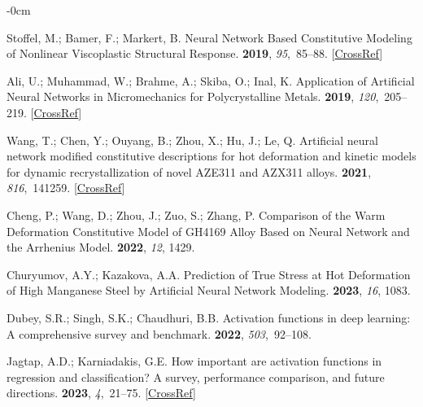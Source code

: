 \documentclass[algorithms,article,accept,pdftex,oneauthor]{Definitions/mdpi}
\begin{document}
\begin{adjustwidth}{-\extralength}{0cm}
\begin{thebibliography}{999}
Stoffel, M.; Bamer, F.; Markert, B.
\newblock Neural Network Based Constitutive Modeling of Nonlinear Viscoplastic
Structural Response.
 {\bf 2019}, {\em 95},~85--88. [\href{http://dx.doi.org/10.1016/j.mechrescom.2019.01.004}{CrossRef}]

Ali, U.; Muhammad, W.; Brahme, A.; Skiba, O.; Inal, K.
\newblock Application of Artificial Neural Networks in Micromechanics for
Polycrystalline Metals.
 {\bf 2019}, {\em
120},~205--219. [\href{http://dx.doi.org/10.1016/j.ijplas.2019.05.001}{CrossRef}]

Wang, T.; Chen, Y.; Ouyang, B.; Zhou, X.; Hu, J.; Le, Q.
\newblock Artificial neural network modified constitutive descriptions for hot
deformation and kinetic models for dynamic recrystallization of novel AZE311
and AZX311 alloys.
 {\bf 2021}, {\em
816},~141259. [\href{http://dx.doi.org/10.1016/j.msea.2021.141259}{CrossRef}]

Cheng, P.; Wang, D.; Zhou, J.; Zuo, S.; Zhang, P.
\newblock Comparison of the Warm Deformation Constitutive Model of GH4169 Alloy
Based on Neural Network and the Arrhenius Model.
 {\bf 2022}, {\em 12}, 1429.

Churyumov, A.Y.; Kazakova, A.A.
\newblock Prediction of True Stress at Hot Deformation of High Manganese Steel
by Artificial Neural Network Modeling.
 {\bf 2023}, {\em 16}, 1083.

Dubey, S.R.; Singh, S.K.; Chaudhuri, B.B.
\newblock Activation functions in deep learning: A comprehensive survey and
benchmark.
 {\bf 2022}, {\em 503},~92--108.

Jagtap, A.D.; Karniadakis, G.E.
\newblock How important are activation functions in regression and
classification? A survey, performance comparison, and future directions.
 {\bf
2023}, {\em 4},~21--75. [\href{http://dx.doi.org/10.1615/JMachLearnModelComput.2023047367}{CrossRef}]


\end{thebibliography}
\end{adjustwidth}
\end{document}
